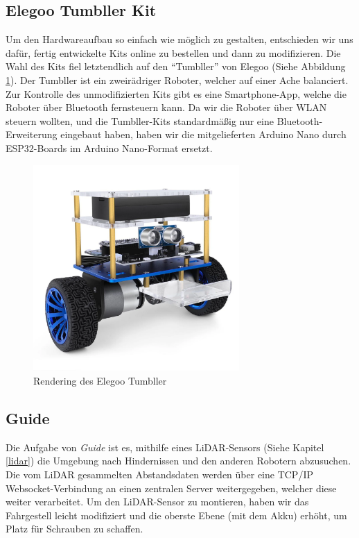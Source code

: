 \documentclass[12pt]{article}
\begin{document}
	\subsection{Elegoo Tumbller Kit}
	Um den Hardwareaufbau so einfach wie möglich zu gestalten,
	entschieden wir uns dafür,
	fertig entwickelte Kits online zu bestellen und dann zu modifizieren.
	Die Wahl des Kits fiel letztendlich auf den ``Tumbller'' von Elegoo (Siehe Abbildung \ref{fig:elegoo_tumbller}).
	Der Tumbller ist ein zweirädriger Roboter, welcher auf einer Ache balanciert.
	Zur Kontrolle des unmodifizierten Kits gibt es eine Smartphone-App,
	welche die Roboter über Bluetooth fernsteuern kann.
	Da wir die Roboter über WLAN steuern wollten, 
	und die Tumbller-Kits standardmäßig nur eine Bluetooth-Erweiterung eingebaut haben,
	haben wir die mitgelieferten Arduino Nano durch ESP32-Boards im Arduino Nano-Format ersetzt.
	\begin{figure}[H]
		\includegraphics[width=0.7\textwidth, center]{img/elegoo_tumbller.png}
		\caption{Rendering des Elegoo Tumbller}
		\label{fig:elegoo_tumbller}
	\end{figure}
	\subsection{Guide}
	Die Aufgabe von \textit{Guide} ist es,
	mithilfe eines LiDAR-Sensors (Siehe Kapitel \ref{lidar}) die Umgebung nach Hindernissen
	und den anderen Robotern abzusuchen.
	Die vom LiDAR gesammelten Abstandsdaten werden über eine TCP/IP Websocket-Verbindung
	an einen zentralen Server weitergegeben,
	welcher diese weiter verarbeitet.
	Um den LiDAR-Sensor zu montieren,
	haben wir das Fahrgestell leicht modifiziert
	und die oberste Ebene (mit dem Akku) erhöht,
	um Platz für Schrauben zu schaffen.
\end{document}

